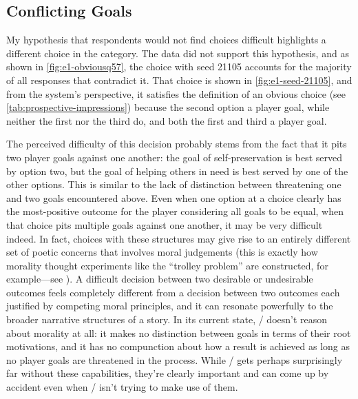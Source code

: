 \subsection{Conflicting Goals}
\label{sec:e1-conflicting-goals}


My hypothesis that respondents would not find \obv{} choices difficult highlights a different choice in the \obv{} category.
%
The data did not support this hypothesis, and as shown in \cref{fig:e1-obviousq57}, the choice with seed 21105 accounts for the majority of all responses that contradict it.
%
That choice is shown in \cref{fig:e1-seed-21105}, and from the system's perspective, it satisfies the definition of an obvious choice (see \cref{tab:prospective-impressions}) because the second option  a player goal, while neither the first nor the third do, and both the first and third  a player goal.


The perceived difficulty of this decision probably stems from the fact that it pits two player goals against one another: the goal of self-preservation is best served by option two, but the goal of helping others in need is best served by one of the other options.
%
This is similar to the lack of distinction between threatening one and two goals encountered above.
%
Even when one option at a choice clearly has the most-positive outcome for the player considering all goals to be equal, when that choice pits multiple goals against one another, it may be very difficult indeed.
%
In fact, choices with these structures may give rise to an entirely different set of poetic concerns that involves moral judgements (this is exactly how morality thought experiments like the ``trolley problem'' are constructed, for example---see \citep{Thomson1976}).
%
A difficult decision between two desirable or undesirable outcomes feels completely different from a decision between two outcomes each justified by competing moral principles, and it can resonate powerfully to the broader narrative structures of a story.
%
In its current state, \dunyazad/ doesn't reason about morality at all: it makes no distinction between goals in terms of their root motivations, and it has no compunction about how a result is achieved as long as no player goals are threatened in the process.
%
While \dunyazad/ gets perhaps surprisingly far without these capabilities, they're clearly important and can come up by accident even when \dunyazad/ isn't trying to make use of them.


